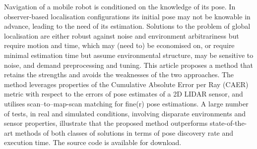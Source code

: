 Navigation of a mobile robot is conditioned on the knowledge of its pose. In
observer-based localisation configurations its initial pose may not be knowable
in advance, leading to the need of its estimation. Solutions to the problem of
global localisation are either robust against noise and environment
arbitrariness but require motion and time, which may (need to) be economised
on, or require minimal estimation time but assume environmental structure, may
be sensitive to noise, and demand preprocessing and tuning. This article
proposes a method that retains the strengths and avoids the weaknesses of the
two approaches. The method leverages properties of the Cumulative Absolute
Error per Ray (CAER) metric with respect to the errors of pose estimates of a
2D LIDAR sensor, and utilises scan--to--map-scan matching for fine(r) pose
estimations. A large number of tests, in real and simulated conditions,
involving disparate environments and sensor properties, illustrate that the
proposed method outperforms state-of-the-art methods of both classes of
solutions in terms of pose discovery rate and execution time. The source code
is available for download.
